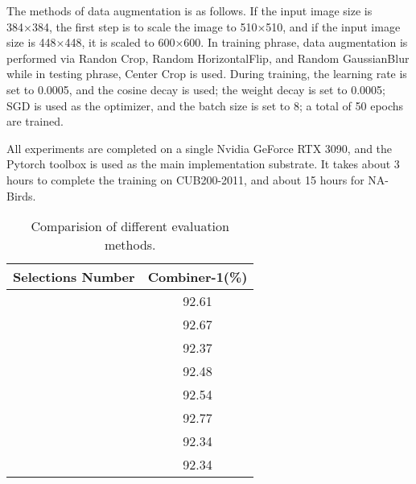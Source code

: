 \documentclass[conference]{IEEEtran}
\begin{document}
The methods of data augmentation is as follows. If the input image size is 384×384, the first step is to scale the image to 510×510, and if the input image size is 448×448, it is scaled to 600×600. In training phrase, data augmentation is performed via Randon Crop, Random HorizontalFlip, and Random GaussianBlur while in testing phrase, Center Crop is used. During training, the learning rate is set to 0.0005, and the cosine decay is used; the weight decay is set to 0.0005; SGD is used as the optimizer, and the batch size is set to 8; a total of 50 epochs are trained.

All experiments are completed on a single Nvidia GeForce RTX 3090, and the Pytorch toolbox is used as the main implementation substrate. It takes about 3 hours to complete the training on CUB200-2011, and about 15 hours for NA-Birds.

\begin{table}[!tp]
\caption{Comparision of different evaluation methods.}
\begin{center}
\begin{tabular}{|c|c|}
\hline
Selections Number & Combiner-1(\%) \\
\hline
[32,32,32,32] & 92.61 \\
\hline
[256,128,64,32] & 92.67 \\
\hline
[512,256,128,64] & 92.37 \\
\hline
[1024,512,128,64] & 92.48 \\
\hline
[1024,512,128,128] & 92.54 \\
\hline
[2048,512,128, 32] & 92.77 \\
\hline
[2048,512,128,128] & 92.34 \\
\hline
[2304,576,144,144] & 92.34 \\
\hline
\end{tabular}
\label{tab5}
\end{center}
\end{table}
\end{document}
